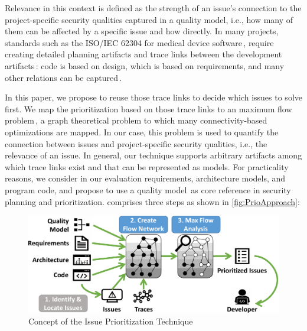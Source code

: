 \noindent
Relevance in this context is defined as the strength of an issue's connection to the project-specific security qualities captured in a quality model, i.e., how many of them can be affected by a specific issue and how directly.
In many projects, standards such as the ISO/IEC 62304 for medical device software\,\cite{IEC62304}, require creating detailed planning artifacts and trace links between the development artifacts\,\cite{tracing}: code is based on design, which is based on requirements, and many other relations can be captured\,\cite{schwarz2010gbt,ISO24765:2010,spanoudakis2005software}.

In this paper, we propose to reuse those trace links to decide which issues to solve first.
We map the prioritization based on those trace links to an maximum flow problem\,\cite{harris1955}, a graph theoretical problem to which many connectivity-based optimizations are mapped.
In our case, this problem is used to quantify the connection between issues and project-specific security qualities, i.e., the relevance of an issue.
In general, our technique \appr{} supports arbitrary artifacts among which trace links exist and that can be represented as models.
For practicality reasons, we consider in our evaluation requirements, architecture models, and program code, and propose to use a quality model\,\cite{Deissenboek2009,Schneider2012ASQ,WAGNER2015101} as core reference in security planning and prioritization.
\appr{} comprises three steps as shown in \autoref{fig:PrioApproach}:



\begin{figure}
	\centering
	\includegraphics[width=.6\columnwidth]{figures/Gesamtschaubild-v05-KG.pdf}%
	\caption{Concept of the Issue Prioritization Technique}
	\label{fig:PrioApproach}
\end{figure}

